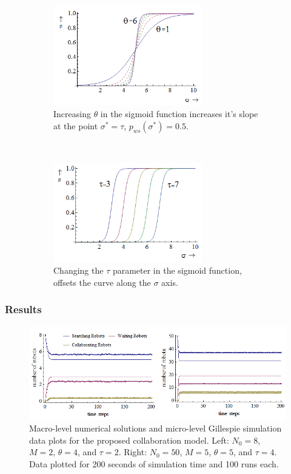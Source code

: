 \documentclass[Main.tex]{subfiles}
\begin{document}
\begin{figure}[!htb]
\centering\begin{subfigure}{.5\textwidth}
\centering\includegraphics[width=6.5cm]{sigmoid1.png}
\caption{Increasing $\theta$ in the sigmoid function increases it's slope at the point $\sigma^* = \tau$, $p_{ws}(\sigma^*) = 0.5$.}
\end{subfigure}~
\centering\begin{subfigure}{.5\textwidth}
\centering\includegraphics[width=6.5cm]{sigmoid2.png}
\caption{Changing the $\tau$ parameter in the sigmoid function, offsets the curve along the $\sigma$ axis.}
\end{subfigure}
\caption{}\label{fig:sig}
\end{figure}

\subsubsection*{Results}
\begin{figure}[!ht]
\centering\includegraphics[width=\textwidth]{macmic.png}
\caption{Macro-level numerical solutions and micro-level Gillespie simulation data plots for the proposed collaboration model. Left: $N_0 = 8$, $M = 2$, $\theta = 4$, and $\tau = 2$. Right: $N_0 = 50$, $M = 5$, $\theta = 5$, and $\tau = 4$. Data plotted for 200 seconds of simulation time and 100 runs each.}\label{fig:macmic}
\end{figure}
\end{document}
